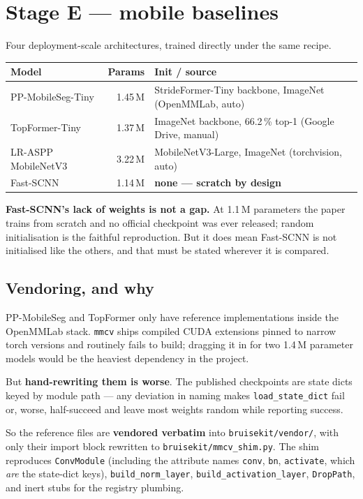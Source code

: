 \documentclass[11pt]{article}
\begin{document}
\section{Stage E --- mobile baselines}

Four deployment-scale architectures, trained directly under the same recipe.

\begin{center}
\begin{tabular}{LnW}
\toprule
\textbf{Model} & \textbf{Params} & \textbf{Init / source} \\
\midrule
PP-MobileSeg-Tiny & 1.45\,M & StrideFormer-Tiny backbone, ImageNet (OpenMMLab, auto) \\
TopFormer-Tiny & 1.37\,M & ImageNet backbone, 66.2\,\% top-1 (Google Drive, manual) \\
LR-ASPP MobileNetV3 & 3.22\,M & MobileNetV3-Large, ImageNet (torchvision, auto) \\
Fast-SCNN & 1.14\,M & \textbf{none --- scratch by design} \\
\bottomrule
\end{tabular}
\end{center}

\textbf{Fast-SCNN's lack of weights is not a gap.} At 1.1\,M parameters the paper
trains from scratch and no official checkpoint was ever released; random
initialisation is the faithful reproduction. But it does mean Fast-SCNN is not
initialised like the others, and that must be stated wherever it is compared.

\subsection{Vendoring, and why}

PP-MobileSeg and TopFormer only have reference implementations inside the
OpenMMLab stack. \texttt{mmcv} ships compiled CUDA extensions pinned to narrow
torch versions and routinely fails to build; dragging it in for two 1.4\,M
parameter models would be the heaviest dependency in the project.

But \textbf{hand-rewriting them is worse}. The published checkpoints are state
dicts keyed by module path --- any deviation in naming makes
\texttt{load\_state\_dict} fail or, worse, half-succeed and leave most weights
random while reporting success.

So the reference files are \textbf{vendored verbatim} into
\texttt{bruisekit/vendor/}, with only their import block rewritten to
\texttt{bruisekit/mmcv\_shim.py}. The shim reproduces \texttt{ConvModule}
(including the attribute names \texttt{conv}, \texttt{bn}, \texttt{activate},
which \emph{are} the state-dict keys), \texttt{build\_norm\_layer},
\texttt{build\_activation\_layer}, \texttt{DropPath}, and inert stubs for the
registry plumbing.
\end{document}
